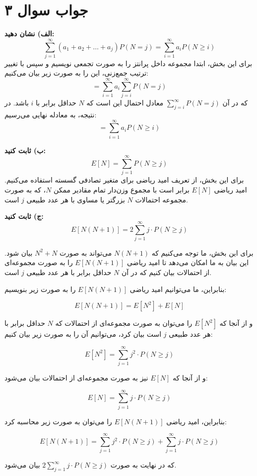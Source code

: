 \section*{جواب سوال ۳}

\textbf{الف) نشان دهید:} 
\[ \sum_{j=1}^{\infty} (a_1 + a_2 + \ldots + a_j) P(N = j) = \sum_{i=1}^{\infty} a_i P(N \geq i) \]
برای این بخش، ابتدا مجموعه داخل پرانتز را به صورت تجمعی نویسیم و سپس با تغییر ترتیب جمع‌زنی، این را به صورت زیر بیان می‌کنیم:
\[ = \sum_{i=1}^{\infty} a_i \sum_{j=i}^{\infty} P(N = j) \]
که در آن \(\sum_{j=i}^{\infty} P(N = j)\) معادل احتمال این است که \(N\) حداقل برابر با \(i\) باشد. در نتیجه، به معادله نهایی می‌رسیم:
\[ = \sum_{i=1}^{\infty} a_i P(N \geq i) \]

\textbf{ب) ثابت کنید:} 
\[ E[N] = \sum_{j=1}^{\infty} P(N \geq j) \]
برای این بخش، از تعریف امید ریاضی برای متغیر تصادفی گسسته استفاده می‌کنیم. امید ریاضی \(E[N]\) برابر است با مجموع وزن‌دار تمام مقادیر ممکن \(N\)، که به صورت مجموعه احتمالات \(N\) بزرگتر یا مساوی با هر عدد طبیعی \(j\) است.

\textbf{ج) ثابت کنید:} 
\[ E[N(N + 1)] = 2 \sum_{j=1}^{\infty} j \cdot P(N \geq j) \]

برای این بخش، ما توجه می‌کنیم که \(N(N + 1)\) می‌تواند به صورت \(N^2 + N\) بیان شود. این بیان به ما امکان می‌دهد تا امید ریاضی \(E[N(N + 1)]\) را به صورت مجموعه‌ای از احتمالات بیان کنیم که در آن \(N\) حداقل برابر با هر عدد طبیعی \(j\) است. 

بنابراین، ما می‌توانیم امید ریاضی \(E[N(N + 1)]\) را به صورت زیر بنویسیم:

\[
E[N(N + 1)] = E[N^2] + E[N]
\]

و از آنجا که \(E[N^2]\) را می‌توان به صورت مجموعه‌ای از احتمالات که \(N\) حداقل برابر با هر عدد طبیعی \(j\) است بیان کرد، می‌توانیم آن را به صورت زیر بیان کنیم:

\[
E[N^2] = \sum_{j=1}^{\infty} j^2 \cdot P(N \geq j)
\]

و از آنجا که \(E[N]\) نیز به صورت مجموعه‌ای از احتمالات بیان می‌شود:

\[
E[N] = \sum_{j=1}^{\infty} j \cdot P(N \geq j)
\]

بنابراین، امید ریاضی \(E[N(N + 1)]\) را می‌توان به صورت زیر محاسبه کرد:

\[
E[N(N + 1)] = \sum_{j=1}^{\infty} j^2 \cdot P(N \geq j) + \sum_{j=1}^{\infty} j \cdot P(N \geq j)
\]

که در نهایت به صورت \(2 \sum_{j=1}^{\infty} j \cdot P(N \geq j)\) بیان می‌شود.